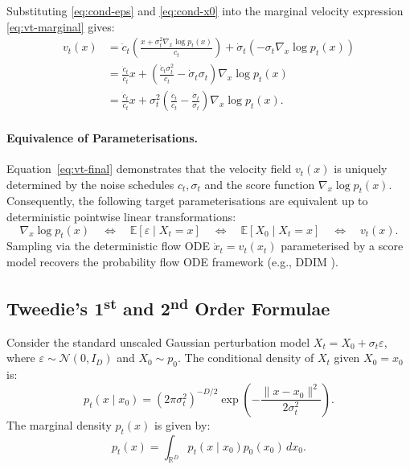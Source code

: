 \documentclass{article}
\theoremstyle{plain}
\theoremstyle{definition}
\theoremstyle{remark}
\begin{document}
Substituting \eqref{eq:cond-eps} and \eqref{eq:cond-x0} into the marginal velocity expression \eqref{eq:vt-marginal} gives:
\begin{align}
v_t(x) &= \dot{c}_t \left( \frac{x + \sigma_t^2 \nabla_x \log p_t(x)}{c_t} \right) + \dot{\sigma}_t \left( -\sigma_t \nabla_x \log p_t(x) \right) \nonumber \\
&= \frac{\dot{c}_t}{c_t} x + \left( \frac{\dot{c}_t \sigma_t^2}{c_t} - \dot{\sigma}_t \sigma_t \right) \nabla_x \log p_t(x) \nonumber \\
&= \frac{\dot{c}_t}{c_t} x + \sigma_t^2 \left( \frac{\dot{c}_t}{c_t} - \frac{\dot{\sigma}_t}{\sigma_t} \right) \nabla_x \log p_t(x). \label{eq:vt-final}
\end{align}

\paragraph{Equivalence of Parameterisations.}
Equation~\eqref{eq:vt-final} demonstrates that the velocity field $v_t(x)$ is uniquely determined by the noise schedules $c_t, \sigma_t$ and the score function $\nabla_x \log p_t(x)$. Consequently, the following target parameterisations are equivalent up to deterministic pointwise linear transformations:
\begin{equation}
\nabla_x \log p_t(x) \quad \iff \quad \mathbb{E}\left[\varepsilon \mid X_t = x\right] \quad \iff \quad \mathbb{E}\left[X_0 \mid X_t = x\right] \quad \iff \quad v_t(x).
\end{equation}
Sampling via the deterministic flow ODE $\dot{x}_t = v_t(x_t)$ parameterised by a score model recovers the probability flow ODE framework (e.g., DDIM \citep{song2020denoising}).

\subsection{Tweedie's 1\textsuperscript{st} and 2\textsuperscript{nd} Order Formulae}
\label{subsec:tweedie}

Consider the standard unscaled Gaussian perturbation model $X_t = X_0 + \sigma_t \varepsilon$, where $\varepsilon \sim \mathcal{N}(0, I_D)$ and $X_0 \sim p_0$. The conditional density of $X_t$ given $X_0 = x_0$ is:
\begin{equation}
p_t(x \mid x_0) = (2\pi \sigma_t^2)^{-D/2} \exp\left( -\frac{\|x - x_0\|^2}{2\sigma_t^2} \right).
\end{equation}
The marginal density $p_t(x)$ is given by:
\begin{equation}
p_t(x) = \int_{\mathbb{R}^D} p_t(x \mid x_0) p_0(x_0) \, dx_0.
\end{equation}
\end{document}
